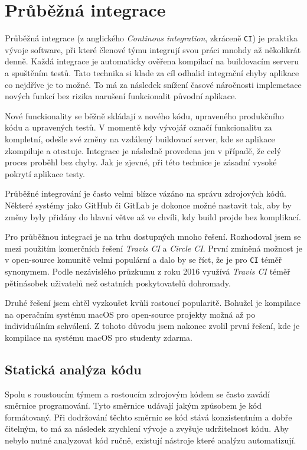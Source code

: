\section{Průběžná integrace}

Průběžná integrace (z anglického \textit{Continous integration}, zkráceně \texttt{CI}) je praktika vývoje software, při které členové týmu integrují svou práci mnohdy až několikrát denně.
Každá integrace je automaticky ověřena kompilací na buildovacím serveru a spuštěním testů.
Tato technika si klade za cíl odhalid integrační chyby aplikace co nejdříve je to možné.
To má za následek snížení časové náročnosti implemetace nových funkcí bez rizika narušení funkcionalit původní aplikace.

Nové funckionality se běžně skládají z nového kódu, upraveného produkčního kódu a upravených testů.
V momentě kdy vývojář označí funkcionalitu za kompletní, odešle své změny na vzdálený buildovací server, kde se aplikace zkompiluje a otestuje.
Integrace je následně provedena jen v případě, že celý proces proběhl bez chyby.
Jak je zjevné, při této technice je zásadní vysoké pokrytí aplikace testy.

Průběžné integrování je často velmi blízce vázáno na správu zdrojových kódů.
Některé systémy jako GitHub či GitLab je dokonce možné nastavit tak, aby by změny byly přidány do hlavní větve až ve chvíli, kdy build projde bez komplikací. \cite{travis-ci-building-pr}

Pro průběžnou integraci je na trhu dostupných mnoho řešení.
Rozhodoval jsem se mezi použitím komerčních řešení \textit{Travis CI} a \textit{Circle CI}.
První zmíněná možnost je v open-source komunitě velmi populární a dalo by se říct, že je pro \texttt{CI} téměř synonymem.
Podle nezávislého průzkumu z roku 2016 využívá \textit{Travis CI} téměř pětinásobek uživatelů než ostatních poskytovatelů dohromady. \cite{oregonstate-ci-survey}

Druhé řešení jsem chtěl vyzkoušet kvůli rostoucí popularitě. \cite{circleci-popularity}
Bohužel je kompilace na operačním systému macOS pro open-source projekty možná až po individuálním schválení. \cite{circleci-pricing}
Z tohoto důvodu jsem nakonec zvolil první řešení, kde je kompilace na systému macOS pro studenty zdarma.

\subsection{Statická analýza kódu}

Spolu s roustoucím týmem a rostoucím zdrojovým kódem se často zavádí směrnice programování.
Tyto směrnice udávají jakým způsobem je kód formátovaný.
Při dodržování těchto směrnic se kód stává konzistentním a dobře čitelným, to má za následek zrychlení vývoje a zvyšuje udržitelnost kódu.
Aby nebylo nutné analyzovat kód ručně, existují nástroje které analýzu automatizují.

